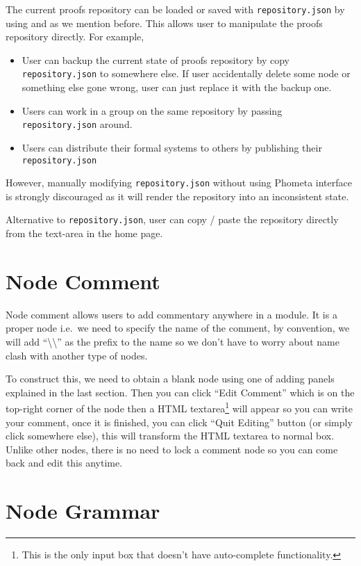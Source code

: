 \documentclass[master.tex]{subfiles}
\begin{document}
The current proofs repository can be loaded or saved with
\texttt{repository.json} by using  and  as we
mention before. This allows user to manipulate the proofs repository directly.
For example,
\begin{itemize}
\item User can backup the current state of proofs repository by copy
  \texttt{repository.json} to somewhere else. If user accidentally delete some node
  or something else gone wrong, user can just replace it with the backup one.
\item Users can work in a group on the same repository by passing
  \texttt{repository.json} around.
\item Users can distribute their formal systems to others by publishing their
  \texttt{repository.json}
\end{itemize}
However, manually modifying \texttt{repository.json} without using Phometa
interface is strongly discouraged as it will render the repository into an
inconsistent state.

Alternative to \texttt{repository.json}, user can copy / paste the repository
directly from the text-area in the home page.

\section{Node Comment}

Node comment allows users to add commentary anywhere in a module. It is a proper
node i.e.\ we need to specify the name of the comment, by convention, we will
add ``\textbackslash\textbackslash'' as the prefix to the name so we don't have
to worry about name clash with another type of nodes.

To construct this, we need to obtain a blank node using one of adding panels
explained in the last section. Then you can click ``Edit Comment'' which is on
the top-right corner of the node then a HTML textarea\footnote{This is the only
  input box that doesn't have auto-complete functionality.} will appear so you can
write your comment, once it is finished, you can click ``Quit Editing'' button
(or simply click somewhere else), this will transform the HTML textarea to
normal box. Unlike other nodes, there is no need to lock a comment node so you
can come back and edit this anytime.

\section{Node Grammar}
\end{document}
